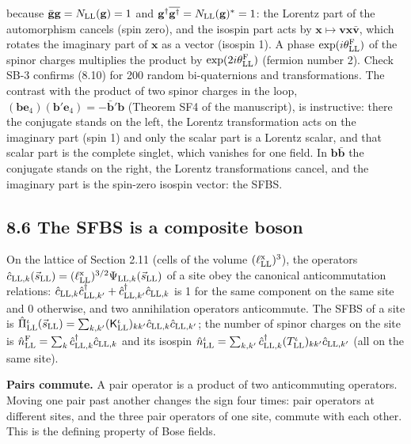 \documentclass[
  10pt,
]{article}
\begin{document}
because \(\bar{\mathbf g}\mathbf g=N_{\rm LL}(\mathbf g)=1\) and
\(\mathbf g^\dagger\overline{\mathbf g^\dagger}=N_{\rm LL}(\mathbf g)^*=1\):
the Lorentz part of the automorphism cancels (spin zero), and the
isospin part acts by
\(\mathbf x\mapsto\mathbf v\mathbf x\bar{\mathbf v}\), which rotates the
imaginary part of \(\mathbf x\) as a vector (isospin 1). A phase
\(\exp(i\theta^{\rm F}_{\rm LL})\) of the spinor charges multiplies the
product by \(\exp(2i\theta^{\rm F}_{\rm LL})\) (fermion number 2). Check
SB-3 confirms (8.10) for 200 random bi-quaternions and transformations.
The contrast with the product of two spinor charges in the loop,
\((\mathbf b\mathbf e_4)(\mathbf b'\mathbf e_4)=-\bar{\mathbf b}'\mathbf b\)
(Theorem SF4 of the manuscript), is instructive: there the conjugate
stands on the left, the Lorentz transformation acts on the imaginary
part (spin 1) and only the scalar part is a Lorentz scalar, and that
scalar part is the complete singlet, which vanishes for one field. In
\(\mathbf b\bar{\mathbf b}\) the conjugate stands on the right, the
Lorentz transformations cancel, and the imaginary part is the spin-zero
isospin vector: the SFBS.

\hypertarget{the-sfbs-is-a-composite-boson}{%
\subsection{8.6 The SFBS is a composite
boson}\label{the-sfbs-is-a-composite-boson}}

On the lattice of Section 2.11 (cells of the volume
\((\ell^{\rm x}_{\rm LL})^3\)), the operators
\(\hat c_{{\rm LL},k}(\vec s_{\rm LL})=(\ell^{\rm x}_{\rm LL})^{3/2}\Psi_{{\rm LL},k}(\vec s_{\rm LL})\)
of a site obey the canonical anticommutation relations:
\(\hat c_{{\rm LL},k}\hat c^\dagger_{{\rm LL},k'}+\hat c^\dagger_{{\rm LL},k'}\hat c_{{\rm LL},k}\)
is 1 for the same component on the same site and 0 otherwise, and two
annihilation operators anticommute. The SFBS of a site is
\(\hat\Pi^\iota_{\rm LL}(\vec s_{\rm LL})=\sum_{k,k'}(\mathsf K^\iota_{\rm LL})_{kk'}\hat c_{{\rm LL},k}\hat c_{{\rm LL},k'}\);
the number of spinor charges on the site is
\(\hat n^{\rm F}_{\rm LL}=\sum_k\hat c^\dagger_{{\rm LL},k}\hat c_{{\rm LL},k}\)
and its isospin
\(\hat n^\iota_{\rm LL}=\sum_{k,k'}\hat c^\dagger_{{\rm LL},k}(T^\iota_{\rm LL})_{kk'}\hat c_{{\rm LL},k'}\)
(all on the same site).

\textbf{Pairs commute.} A pair operator is a product of two
anticommuting operators. Moving one pair past another changes the sign
four times: pair operators at different sites, and the three pair
operators of one site, commute with each other. This is the defining
property of Bose fields.
\end{document}
